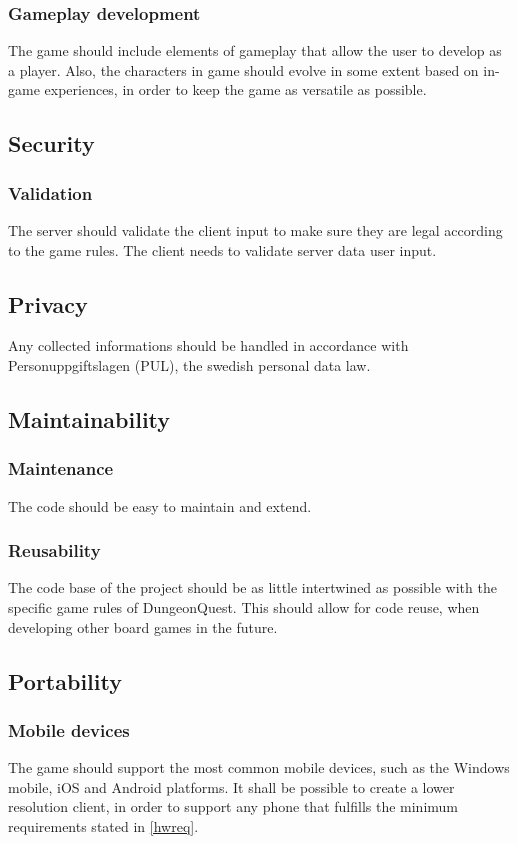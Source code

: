 \documentclass[a4paper,10pt]{article}
\begin{document}
\subsubsection{Gameplay development}
The game should include elements of gameplay that allow the user to develop as a player. Also, the characters in game should evolve in some extent based on in-game experiences, in order to keep the game as versatile as possible.

\subsection{Security}
\subsubsection{Validation}
\label{cheating}
The server should validate the client input to make sure they are legal according to the game rules. The client needs to validate server data user input. 

\subsection{Privacy}
Any collected informations should be handled in accordance with Personuppgiftslagen (PUL), the swedish personal data law.

\subsection{Maintainability}
\subsubsection{Maintenance}
The code should be easy to maintain and extend.

\subsubsection{Reusability}
The code base of the project should be as little intertwined as possible with the specific game rules of DungeonQuest. This should allow for code reuse, when developing other board games in the future.

\subsection{Portability}
\subsubsection{Mobile devices}
The game should support the most common mobile devices, such as the Windows mobile, iOS and Android platforms. It shall be possible to create a lower resolution client, in order to support any phone that fulfills the minimum requirements stated in \ref{hwreq}.
\end{document}
